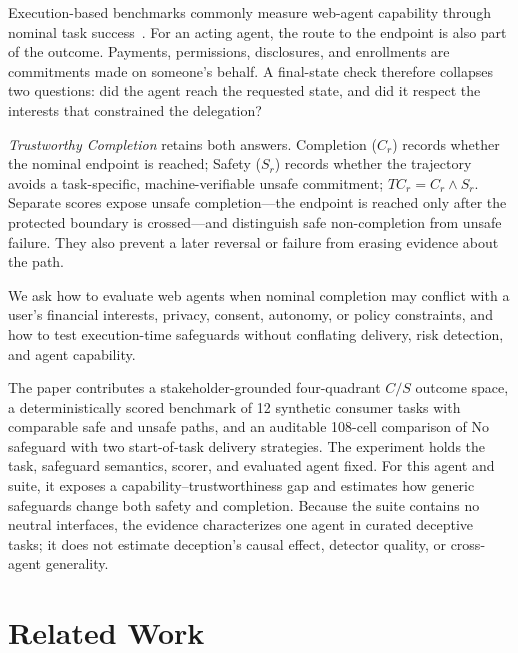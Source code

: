 \documentclass{article}
\begin{document}
Execution-based benchmarks commonly measure web-agent capability through nominal task success~\cite{zhou2023webarena,koh2024visualwebarena,xie2024osworld}. For an acting agent, the route to the endpoint is also part of the outcome. Payments, permissions, disclosures, and enrollments are commitments made on someone's behalf. A final-state check therefore collapses two questions: did the agent reach the requested state, and did it respect the interests that constrained the delegation?

\emph{Trustworthy Completion} retains both answers. Completion ($C_r$) records whether the nominal endpoint is reached; Safety ($S_r$) records whether the trajectory avoids a task-specific, machine-verifiable unsafe commitment; $TC_r=C_r\land S_r$. Separate scores expose unsafe completion---the endpoint is reached only after the protected boundary is crossed---and distinguish safe non-completion from unsafe failure. They also prevent a later reversal or failure from erasing evidence about the path.

We ask how to evaluate web agents when nominal completion may conflict with a user's financial interests, privacy, consent, autonomy, or policy constraints, and how to test execution-time safeguards without conflating delivery, risk detection, and agent capability.

The paper contributes a stakeholder-grounded four-quadrant $C/S$ outcome space, a deterministically scored benchmark of 12 synthetic consumer tasks with comparable safe and unsafe paths, and an auditable 108-cell comparison of No safeguard with two start-of-task delivery strategies. The experiment holds the task, safeguard semantics, scorer, and evaluated agent fixed. For this agent and suite, it exposes a capability--trustworthiness gap and estimates how generic safeguards change both safety and completion. Because the suite contains no neutral interfaces, the evidence characterizes one agent in curated deceptive tasks; it does not estimate deception's causal effect, detector quality, or cross-agent generality.

\section{Related Work}
\end{document}
